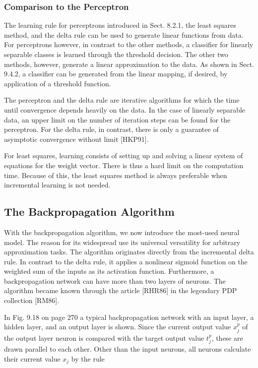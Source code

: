 \documentclass[10pt]{article}
\begin{document}
\subsubsection*{Comparison to the Perceptron}
The learning rule for perceptrons introduced in Sect. 8.2.1, the least squares method, and the delta rule can be used to generate linear functions from data. For perceptrons however, in contrast to the other methods, a classifier for linearly separable classes is learned through the threshold decision. The other two methods, however, generate a linear approximation to the data. As shown in Sect. 9.4.2, a classifier can be generated from the linear mapping, if desired, by application of a threshold function.

The perceptron and the delta rule are iterative algorithms for which the time until convergence depends heavily on the data. In the case of linearly separable data, an upper limit on the number of iteration steps can be found for the perceptron. For the delta rule, in contrast, there is only a guarantee of asymptotic convergence without limit [HKP91].

For least squares, learning consists of setting up and solving a linear system of equations for the weight vector. There is thus a hard limit on the computation time. Because of this, the least squares method is always preferable when incremental learning is not needed.

\subsection*{The Backpropagation Algorithm}
With the backpropagation algorithm, we now introduce the most-used neural model. The reason for its widespread use its universal versatility for arbitrary approximation tasks. The algorithm originates directly from the incremental delta rule. In contrast to the delta rule, it applies a nonlinear sigmoid function on the weighted sum of the inputs as its activation function. Furthermore, a backpropagation network can have more than two layers of neurons. The algorithm became known through the article [RHR86] in the legendary PDP collection [RM86].

In Fig. 9.18 on page 270 a typical backpropagation network with an input layer, a hidden layer, and an output layer is shown. Since the current output value $x_{j}^{p}$ of the output layer neuron is compared with the target output value $t_{j}^{p}$, these are drawn parallel to each other. Other than the input neurons, all neurons calculate their current value $x_{j}$ by the rule
\end{document}

